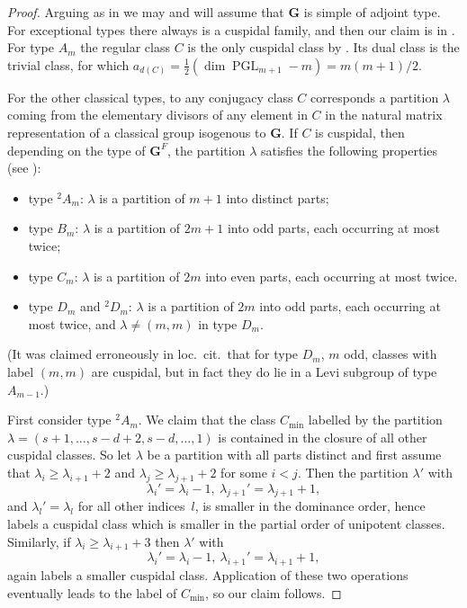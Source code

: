 \documentclass[12pt,leqno,a4paper]{amsart}
\newcommand{\bG}{{\mathbf{G}}}
\newcommand{\PGL}{{\operatorname{PGL}}}
\newcommand{\mi}{{\operatorname{min}}}
\newcommand{\tw}[1]{{}^{#1}\!}
\let\la=\lambda
\theoremstyle{remark}
\begin{document}
\begin{proof}
Arguing as in \cite[\S3.4]{GM96} we may and will assume that $\bG$ is simple
of adjoint type. For exceptional types there always is a cuspidal family, and
then our claim is in \cite[Thm.~3.3]{GM96}. For type $A_m$ the regular class
$C$ is the only cuspidal class by \cite[Prop.~3.6]{GM96}. Its dual class is
the trivial class, for which $a_{d(C)}=\frac{1}{2}(\dim\PGL_{m+1}-m)=m(m+1)/2$.
\smallskip

For the other classical types,
to any conjugacy class $C$ corresponds a partition $\la$ coming from
the elementary divisors of any element in $C$ in the natural matrix
representation of a classical group isogenous to $\bG$. If $C$ is cuspidal,
then depending on the type of $\bG^F$, the partition $\la$ satisfies the
following properties (see \cite[Prop.~3.6]{GM96}):
\begin{itemize}
 \item type $\tw2A_m$: $\la$ is a partition of $m+1$ into distinct parts;
 \item type $B_{m}$: $\la$ is a partition of $2m+1$ into odd parts, each
  occurring at most twice;
 \item type $C_{m}$: $\la$ is a partition of $2m$ into even parts, each
  occurring at most twice.
 \item type $D_m$ and $\tw2D_m$: $\la$ is a partition of $2m$ into odd parts,
  each occurring at most twice, and $\la\ne(m,m)$ in type $D_m$.
\end{itemize}
(It was claimed erroneously in loc.~cit.~that for type $D_m$, $m$ odd, classes
with label $(m,m)$ are cuspidal, but in fact they do lie in a Levi subgroup of
type $A_{m-1}$.)  \par
First consider type $\tw2A_m$. We claim that the class $C_\mi$ labelled by the
partition $\la=(s+1,\ldots,s-d+2,s-d,\ldots,1)$ is contained in the closure of
all other cuspidal classes. So let $\la$ be a partition with all parts distinct
and first assume that $\la_i\ge\la_{i+1}+2$ and $\la_j\ge\la_{j+1}+2$ for some
$i<j$. Then the partition $\la'$ with
$$\la_i'=\la_i-1,\ \la_{j+1}'=\la_{j+1}+1,$$
and $\la_l'=\la_l$ for all other indices~$l$, is smaller in the dominance order,
hence labels a cuspidal class which is smaller in the partial order of
unipotent classes. Similarly, if $\la_i\ge\la_{i+1}+3$ then $\la'$ with
$$\la_i'=\la_i-1,\ \la_{i+1}'=\la_{i+1}+1,$$
again labels a smaller cuspidal class. Application of these two operations
eventually leads to the label of $C_\mi$, so our claim follows.
\par

\end{proof}
\end{document}
